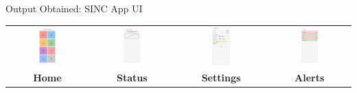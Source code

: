 \documentclass{beamer}
\begin{document}
\begin{frame}{Output Obtained: SINC App UI}
    \centering
    \begin{tabular}{cccc}
        \vspace{0.5cm}
        \includegraphics[width=0.22\textwidth]{athira/app4.jpeg} &
        \includegraphics[width=0.22\textwidth]{athira/app5.jpeg} &
        \includegraphics[width=0.22\textwidth]{athira/app2.jpeg}&
        \includegraphics[width=0.22\textwidth]{athira/app6.jpeg}\\
        \textbf{Home} & \textbf{Status} & \textbf{Settings} &\textbf{Alerts}\\
    \end{tabular}
\end{frame}
\end{document}

